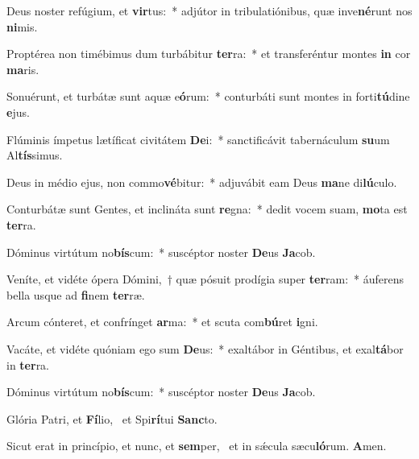\item Deus noster refúgium, et \textbf{vir}tus:~* adjútor in tribulatiónibus, quæ inve\textbf{né}runt nos \textbf{ni}mis.
\item Proptérea non timébimus dum turbábitur \textbf{ter}ra:~* et transferéntur montes \textbf{in} cor \textbf{ma}ris.
\item Sonuérunt, et turbátæ sunt aquæ e\textbf{ó}rum:~* conturbáti sunt montes in forti\textbf{tú}dine \textbf{e}jus.
\item Flúminis ímpetus lætíficat civitátem \textbf{De}i:~* sanctificávit tabernáculum \textbf{su}um Al\textbf{tís}simus.
\item Deus in médio ejus, non commo\textbf{vé}bitur:~* adjuvábit eam Deus \textbf{ma}ne di\textbf{lú}culo.
\item Conturbátæ sunt Gentes, et inclináta sunt \textbf{re}gna:~* dedit vocem suam, \textbf{mo}ta est \textbf{ter}ra.
\item Dóminus virtútum no\textbf{bís}cum:~* suscéptor noster \textbf{De}us \textbf{Ja}cob.
\item Veníte, et vidéte ópera Dómini,~† quæ pósuit prodígia super \textbf{ter}ram:~* áuferens bella usque ad \textbf{fi}nem \textbf{ter}ræ.
\item Arcum cónteret, et confrínget \textbf{ar}ma:~* et scuta com\textbf{bú}ret \textbf{i}gni.
\item Vacáte, et vidéte quóniam ego sum \textbf{De}us:~* exaltábor in Géntibus, et exal\textbf{tá}bor in \textbf{ter}ra.
\item Dóminus virtútum no\textbf{bís}cum:~* suscéptor noster \textbf{De}us \textbf{Ja}cob.
\item Glória Patri, et \textbf{Fí}lio,~\psstar{} et Spi\textbf{rí}tui \textbf{Sanc}to.
\item Sicut erat in princípio, et nunc, et \textbf{sem}per,~\psstar{} et in sǽcula sæcu\textbf{ló}rum. \textbf{A}men.
